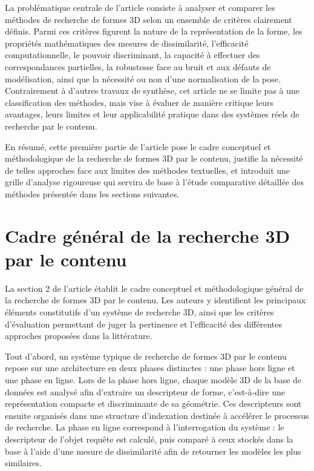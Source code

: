 \documentclass[11pt,a4paper,oneside]{report}
\begin{document}
La problématique centrale de l’article consiste à analyser et comparer les méthodes de recherche de formes 3D selon un ensemble de critères clairement définis. Parmi ces critères figurent la nature de la représentation de la forme, les propriétés mathématiques des mesures de dissimilarité, l’efficacité computationnelle, le pouvoir discriminant, la capacité à effectuer des correspondances partielles, la robustesse face au bruit et aux défauts de modélisation, ainsi que la nécessité ou non d’une normalisation de la pose. Contrairement à d’autres travaux de synthèse, cet article ne se limite pas à une classification des méthodes, mais vise à évaluer de manière critique leurs avantages, leurs limites et leur applicabilité pratique dans des systèmes réels de recherche par le contenu.

En résumé, cette première partie de l’article pose le cadre conceptuel et méthodologique de la recherche de formes 3D par le contenu, justifie la nécessité de telles approches face aux limites des méthodes textuelles, et introduit une grille d’analyse rigoureuse qui servira de base à l’étude comparative détaillée des méthodes présentée dans les sections suivantes.

\section{Cadre général de la recherche 3D par le contenu}

La section 2 de l’article établit le cadre conceptuel et méthodologique général de la recherche de formes 3D par le contenu. Les auteurs y identifient les principaux éléments constitutifs d’un système de recherche 3D, ainsi que les critères d’évaluation permettant de juger la pertinence et l’efficacité des différentes approches proposées dans la littérature.

Tout d’abord, un système typique de recherche de formes 3D par le contenu repose sur une architecture en deux phases distinctes : une phase hors ligne et une phase en ligne. Lors de la phase hors ligne, chaque modèle 3D de la base de données est analysé afin d’extraire un descripteur de forme, c’est-à-dire une représentation compacte et discriminante de sa géométrie. Ces descripteurs sont ensuite organisés dans une structure d’indexation destinée à accélérer le processus de recherche. La phase en ligne correspond à l’interrogation du système : le descripteur de l’objet requête est calculé, puis comparé à ceux stockés dans la base à l’aide d’une mesure de dissimilarité afin de retourner les modèles les plus similaires.
\end{document}
